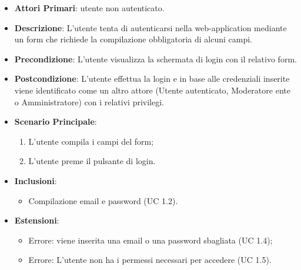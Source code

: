 		\begin{itemize}
			\item \textbf{Attori Primari}: utente non autenticato.
			\item \textbf{Descrizione}: L'utente tenta di autenticarsi nella web-application mediante un form che richiede la compilazione obbligatoria di alcuni campi.
			\item \textbf{Precondizione}: L'utente visualizza la schermata di login con il relativo form.
			\item \textbf{Postcondizione}: L'utente effettua la login e in base alle credenziali inserite viene identificato come un altro attore (Utente autenticato, Moderatore ente o Amministratore) con i relativi privilegi.
			\item \textbf{Scenario Principale}:
			\begin{enumerate}
				\item L'utente compila i campi del form;
				\item L'utente preme il pulsante di login.
			\end{enumerate}
			\item \textbf{Inclusioni}:
				\begin{itemize}
					\item Compilazione email e password (UC 1.2).
				\end{itemize}
			\item \textbf{Estensioni}:
				\begin{itemize}
					\item Errore: viene inserita una email o una password sbagliata (UC 1.4);
					\item Errore: L'utente non ha i permessi necessari per accedere (UC 1.5).
				\end{itemize}
		\end{itemize}

